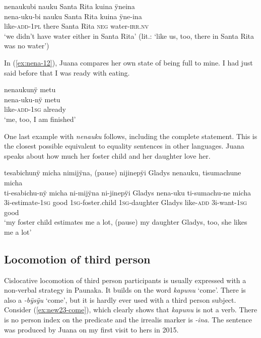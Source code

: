 \ea\label{ex:nena-10}
\begingl
\glpreamble nenaukubi nauku Santa Rita kuina ÿneina\\
\gla nena-uku-bi nauku {Santa Rita} kuina ÿne-ina\\
\glb like-\textsc{add}-1\textsc{pl} there {Santa Rita} \textsc{neg} water-\textsc{irr.nv}\\
\glft ‘we didn’t have water either in Santa Rita’ (lit.: ‘like us, too, there in Santa Rita was no water’)
\endgl
\trailingcitation{[mqx-p110826l.103]}
\xe

In (\ref{ex:nena-12}), Juana compares her own state of being full to mine. I had just said before that I was ready with eating.

\ea\label{ex:nena-12}
\begingl 
\glpreamble nenaukunÿ metu\\
\gla nena-uku-nÿ metu\\ 
\glb like-\textsc{add}-1\textsc{sg} already\\ 
\glft ‘me, too, I am finished’
\trailingcitation{[jxx-p120515l-2.262]}
\xe

One last example with \textit{nenauku} follows, including the complete statement. This is the closest possible equivalent to equality sentences in other languages. Juana speaks about how much her foster child and her daughter love her.

\ea\label{ex:nena-11}
\begingl
\glpreamble tesabichunÿ micha nimijÿna, \textup{(pause)} nijinepÿi Gladys nenauku, tisumachune micha\\
\gla ti-esabichu-nÿ micha ni-mijÿna ni-jinepÿi Gladys nena-uku ti-sumachu-ne micha\\
\glb 3i-estimate-1\textsc{sg} good 1\textsc{sg}-foster.child 1\textsc{sg}-daughter Gladys like-\textsc{add} 3i-want-1\textsc{sg} good\\
\glft ‘my foster child estimates me a lot, (pause) my daughter Gladys, too, she likes me a lot’
\endgl
\trailingcitation{[jxx-p110923l-1.212-214]}
\xe
{}

\subsection{Locomotion of third person}\label{sec:Kapunu}

Cislocative locomotion of third person participants is usually expressed with a non-verbal strategy in Paunaka. It builds on the word \textit{kapunu} ‘come’. There is also a  \textit{-bÿsÿu} ‘come’, but it is hardly ever used with a third person subject. Consider (\ref{ex:new23-come}), which clearly shows that \textit{kapunu} is not a verb. There is no person index on the predicate and the irrealis marker is \textit{-ina}. The sentence was produced by Juana on my first visit to hers in 2015.


